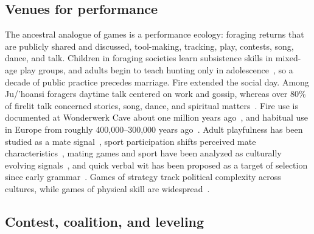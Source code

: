\subsection{Venues for performance}

The ancestral analogue of games is a performance ecology: foraging returns that are publicly shared and discussed,
tool-making, tracking, play, contests, song, dance, and talk. Children in foraging societies learn subsistence skills in
mixed-age play groups, and adults begin to teach hunting only in adolescence~\cite{lewlevy2017}, so a decade of public
practice precedes marriage. Fire extended the social day. Among Ju/'hoansi foragers daytime talk centered on work and gossip,
whereas over 80\% of firelit talk concerned stories, song, dance, and spiritual matters~\cite{wiessner2014}. Fire use is
documented at Wonderwerk Cave about one million years ago~\cite{berna2012}, and habitual use in Europe from roughly
400,000--300,000 years ago~\cite{roebroeks2011}. Adult playfulness has been studied as a mate
signal~\cite{chick2012,moraes2022}, sport participation shifts perceived mate characteristics~\cite{schultehostedde2012}, mating
games and sport have been analyzed as culturally evolving signals~\cite{deblock2007,deblock2009}, and quick verbal wit has
been proposed as a target of selection since early grammar~\cite{progovac2026}. Games of strategy track political complexity
across cultures, while games of physical skill are widespread~\cite{roberts1959}.

\subsection{Contest, coalition, and leveling}

